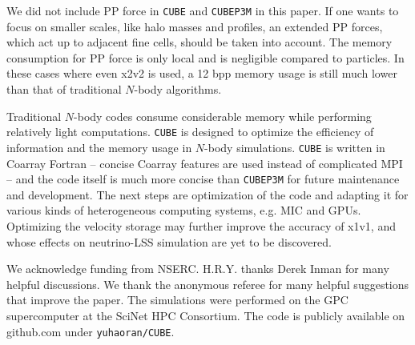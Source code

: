 \documentclass[10pt,twocolumn,preprint]{emulateapj}
\begin{document}
We did not include PP force in {\tt CUBE} and {\tt CUBEP3M} in this paper. If one wants to focus on smaller scales, like halo masses and profiles, an extended PP forces, which act up to adjacent fine cells, should be taken into account. The memory consumption for PP force is only local and is negligible compared to particles. In these cases where even x2v2 is used, a 12 bpp memory usage is still much lower than that of traditional $N$-body algorithms.

Traditional $N$-body codes consume considerable memory while performing relatively light computations. {\tt CUBE} is designed to optimize the efficiency of information and the memory usage in $N$-body simulations. {\tt CUBE} is written in Coarray Fortran -- concise Coarray features are used instead of complicated MPI -- and the code itself is much more concise than {\tt CUBEP3M} for future maintenance and development. The next steps are optimization of the code and adapting it for various kinds of heterogeneous computing systems, e.g. MIC and GPUs. Optimizing the velocity storage may further improve the accuracy of x1v1, and whose effects on neutrino-LSS simulation are yet to be discovered.

\acknowledgements
We acknowledge funding from NSERC.
H.R.Y. thanks Derek Inman for many helpful discussions. We thank the anonymous referee for many helpful suggestions that improve the paper.
The simulations were performed on the GPC supercomputer at the SciNet HPC Consortium.
The code is publicly available on github.com under {\tt yuhaoran/CUBE}.



\end{document}
